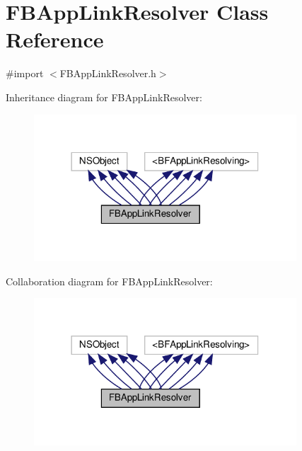 \hypertarget{interfaceFBAppLinkResolver}{}\section{F\+B\+App\+Link\+Resolver Class Reference}
\label{interfaceFBAppLinkResolver}


{\ttfamily \#import $<$F\+B\+App\+Link\+Resolver.\+h$>$}



Inheritance diagram for F\+B\+App\+Link\+Resolver\+:
\nopagebreak
\begin{figure}[H]
\begin{center}
\leavevmode
\includegraphics[width=278pt]{interfaceFBAppLinkResolver__inherit__graph}
\end{center}
\end{figure}


Collaboration diagram for F\+B\+App\+Link\+Resolver\+:
\nopagebreak
\begin{figure}[H]
\begin{center}
\leavevmode
\includegraphics[width=278pt]{interfaceFBAppLinkResolver__coll__graph}
\end{center}
\end{figure}
